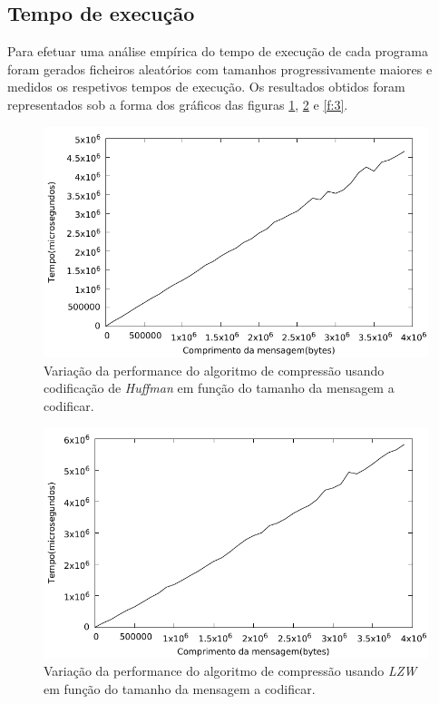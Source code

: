 \documentclass[a4paper,12pt,titlepage]{article}
\begin{document}
\subsection{Tempo de execução}
Para efetuar uma análise empírica do tempo de execução de cada programa foram gerados ficheiros aleatórios com tamanhos progressivamente maiores e medidos os respetivos tempos de execução. Os resultados obtidos foram representados sob a forma dos gráficos das figuras \ref{f:1}, \ref{f:2} e \ref{f:3}.\newline
\begin{figure}
\includegraphics{huff.pdf}
\caption{Variação da performance do algoritmo de compressão usando codificação de \emph{Huffman} em função do tamanho da mensagem a codificar.}
\label{f:1}
\end{figure}
\begin{figure}
\includegraphics{lzw.pdf}
\caption{Variação da performance do algoritmo de compressão usando \emph{LZW} em função do tamanho da mensagem a codificar.}
\label{f:2}
\end{figure}
\end{document}
